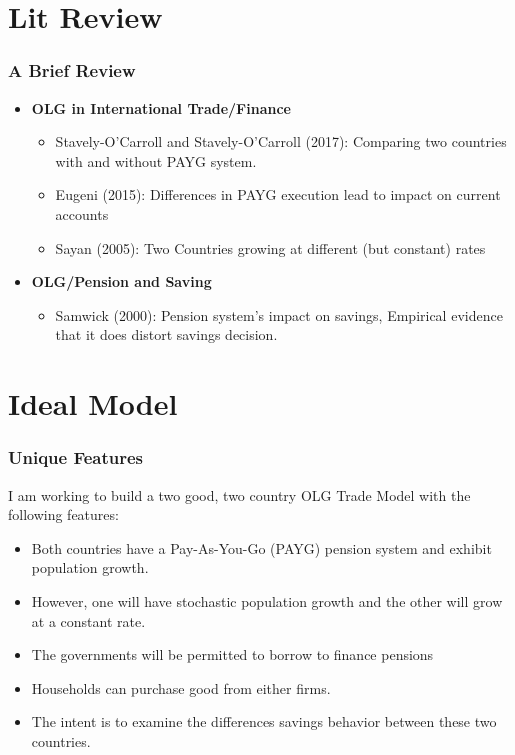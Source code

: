 \documentclass[11pt]{beamer}
\theoremstyle{definition}
\begin{document}
\section{Lit Review} 
\begin{frame}
    \frametitle{A Brief Review}

    \begin{itemize}
        \item \textbf{OLG in International Trade/Finance}
            \begin{itemize}
                \item Stavely-O'Carroll and Stavely-O'Carroll (2017): Comparing two countries with and without PAYG system.
                \item Eugeni (2015): Differences in PAYG execution lead to impact on current accounts
                \item Sayan (2005): Two Countries growing at different (but constant) rates
            \end{itemize}

        \item \textbf{OLG/Pension and Saving}
            \begin{itemize}
                \item Samwick (2000): Pension system's impact on savings, Empirical evidence that it does distort savings decision.

            \end{itemize}

    \end{itemize}

\end{frame}

\section{Ideal Model} 
\begin{frame}
    \frametitle{Unique Features}
I am working to build a two good, two country OLG Trade Model with the following features:
    \begin{itemize}
        \item Both countries have a Pay-As-You-Go (PAYG) pension system and exhibit population growth.
        \item However, one will have stochastic population growth and the other will grow at a constant rate.
        \item The governments will be permitted to borrow to finance pensions
        \item Households can purchase good from either firms. 
        \item The intent is to examine the differences savings behavior between these two countries.

    \end{itemize}


\end{frame}
\end{document}
